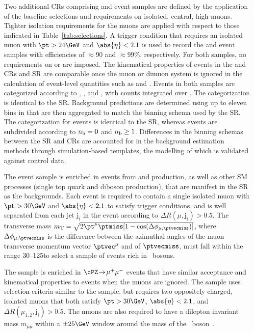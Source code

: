 Two additional CRs comprising \mj and \mmj event samples are defined
by the application of the baseline selections and requirements on
isolated, central, high-\pt muons. Tighter isolation requirements for
the muons are applied with respect to those indicated in
Table~\ref{tab:selections}.  A trigger condition that requires an
isolated muon with $\pt > 24\GeV$ and $\abs{\eta} < 2.1$ is used to
record the \mj and \mmj event samples with efficiencies of
${\approx}90$ and ${\approx}99\%$, respectively. For both samples, no
requirements on \alphat or \bdphi are imposed. The kinematical
properties of events in the \mj and \mmj CRs and SR are comparable
once the muon or dimuon system is ignored in the calculation of
event-level quantities such as \scalht and \mht.  Events in both
samples are categorized according to \njet, \scalht, and \nb, with
counts integrated over \mht. The \njet categorization is identical to
the SR. Background predictions are determined using up to eleven bins
in \scalht that are then aggregated to match the \scalht binning
schema used by the SR. The \nb categorization for \mj events is
identical to the SR, whereas \mmj events are subdivided according to
$n_{\mathrm{b}} = 0$ and $n_{\mathrm{b}} \geq 1$. Differences in the binning schemas between
the SR and CRs are accounted for in the background estimation methods
through simulation-based templates, the modelling of which is
validated against control data.

The \mj event sample is enriched in events from \wmj and \ttbar
production, as well as other SM processes (\eg single top quark and
diboson production), that are manifest in the SR as the \lost
backgrounds. Each event is required to contain a single isolated muon
with $\pt > 30\GeV$ and $\abs{\eta} < 2.1$ to satisfy trigger
conditions, and is well separated from each jet $\mathrm{j}_i$ in the
event according to ${\Delta}R(\mu,\mathrm{j}_i) > 0.5$. The transverse
mass $m_\mathrm{T} = \sqrt{2\pt^\mu\ptmiss[1-
  \cos(\Delta\phi_{\mu,\ptvecmiss})]}$, where
$\Delta\phi_{\mu,\ptvecmiss}$ is the difference between the azimuthal
angles of the muon transverse momentum vector $\ptvec^\mu$ and of
$\ptvecmiss$, must fall within the range 30--125\GeV to select a
sample of events rich in \PW\ bosons.

The \mmj sample is enriched in $\cPZ\! \to\!  \mu^+\mu^-$ events that
have similar acceptance and kinematical properties to \znunuj events
when the muons are ignored. The sample uses selection criteria similar
to the \mj sample, but requires two oppositely charged, isolated muons
that both satisfy $\pt > 30\GeV$, $\abs{\eta} < 2.1$, and
${\Delta}R(\mu_{1,2},\mathrm{j}_i) > 0.5$. The muons are also required
to have a dilepton invariant mass $m_{\mu\mu}$ within a ${\pm}25\GeV$
window around the mass of the \cPZ\ boson~\cite{Patrignani:2016xqp}.

